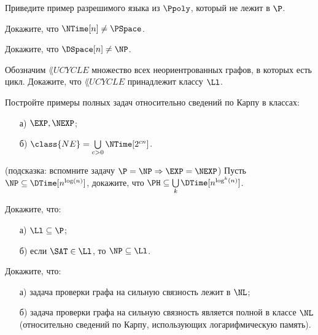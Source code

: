 

\begin{task}
	Приведите пример разрешимого языка из $\Ppoly$, который не лежит в $\P$. 
\end{task}

\begin{task}
	Докажите, что $\NTime[n] \neq \PSpace$.
\end{task}

\begin{task}
	Докажите, что $\DSpace[n] \neq \NP$.
\end{task}

\begin{task}
	Обозначим $\lang{UCYCLE}$ множество всех неориентрованных графов, в которых есть цикл. Докажите, что $\lang{UCYCLE}$
    принадлежит классу $\Ll$. 
\end{task}





\breakline


\begin{ptask}{20}
	Постройте примеры полных задач относительно сведений по Карпу в классах:
    \begin{enumerate}[topsep = 0pt, itemsep = -1ex]
        \item [а)] $\EXP, \NEXP$;
        \item [б)] $\class{NE} = \bigcup\limits_{c > 0} \NTime[2^{cn}]$.
	\end{enumerate}
\end{ptask}

\begin{ptask}{21}(подсказка: вспомните задачу $\P = \NP \Rightarrow \EXP = \NEXP$)
    Пусть $\NP \subseteq \DTime[n^{\log(n)}]$, докажите, что $\PH \subseteq \bigcup\limits_{k} \DTime[n^{\log^k(n)}]$.
\end{ptask}

\begin{ptask}{23}
    Докажите, что:
    \begin{enumerate}[topsep = 0pt, itemsep = -1ex]
        \item [а)] $\Ll \subseteq \P$;
        \item [б)] если $\SAT \in \Ll$, то $\NP \subseteq \Ll$.
	\end{enumerate}
\end{ptask}

\begin{ptask}{24}
    Докажите, что:
    \begin{enumerate}[topsep = 0pt, itemsep = -1ex]
        \item [а)] задача проверки графа на сильную связность лежит в $\NL$;
        \item [б)] задача проверки графа на сильную связность является полной в классе $\NL$ (относительно сведений по Карпу,
            использующих логарифмическую память).
	\end{enumerate}
\end{ptask}


